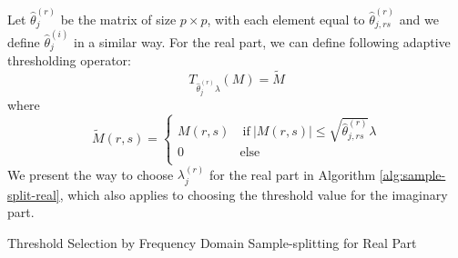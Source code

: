 Let $\hat{\theta}_j^{(r)}$ be the matrix of size $p\times p$, with each element equal to  $\hat{\theta}^{(r)}_{j, rs}$ and we define $\hat{\theta}_j^{(i)}$ in a similar way. For the real part, we can  define following adaptive thresholding operator:
\begin{equation}
T_{\hat{\theta}_j^{(r)}\lambda} (M) = \tilde{M} 
\end{equation}
where 
\begin{equation}
\tilde{M} (r, s) = \begin{cases}
M(r, s) & ~\text{if}~ |M(r, s)| \le \sqrt{\hat{\theta}^{(r)}_{j, rs}}\lambda  \\
0 & \text{else}
\\
\end{cases}
\end{equation}
We present the way to choose $\lambda^{(r)}_j$ for the real part in Algorithm \ref{alg:sample-split-real}, which also applies to choosing the threshold value for the imaginary part. 



\begin{algorithm2e}[t]\small
	\DontPrintSemicolon 
	\caption{Threshold Selection by Frequency Domain Sample-splitting for Real Part}
	\label{alg:sample-split-real}
	\label{al1}
\end{algorithm2e}



